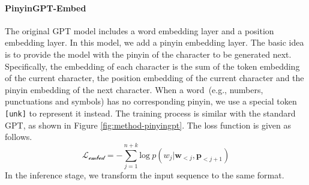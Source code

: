 % 




\paragraph{PinyinGPT-Embed}
\label{sec:composition}
The original GPT model includes a word embedding layer and a position embedding layer.
In this model, we add a pinyin embedding layer. 
The basic idea is to provide the model with the pinyin of the character to be generated next.
Specifically, the embedding of each character is the sum of the  token embedding of the current character, the position embedding of the current character and the pinyin embedding of the next character. 
When a word~(e.g., numbers, punctuations and symbols) has no corresponding pinyin, we use a special token \texttt{[unk]} to represent it instead.
The training process is similar with the standard GPT, as shown in Figure \ref{fig:method-pinyingpt}.
The loss function is given as follows.
\begin{equation}
\mathcal{L_\text{embed}} = - \sum_{j=1}^{n+k} \text{log} \ p(w_j|\mathbf{w}_{<j}, \mathbf{p}_{<j+1})
\end{equation}
In the inference stage, we transform the input sequence to the same format.


